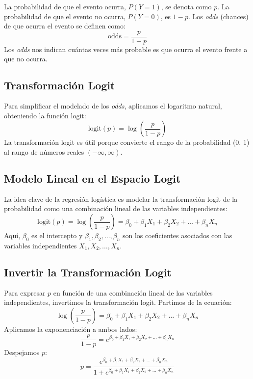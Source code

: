 La probabilidad de que el evento ocurra, $P(Y=1)$, se denota como $p$. La probabilidad de que el evento no ocurra, $P(Y=0)$, es $1-p$. Los \textit{odds} (chances) de que ocurra el evento se definen como:
\begin{equation}
\text{odds} = \frac{p}{1-p}
\end{equation}
Los \textit{odds} nos indican cuántas veces más probable es que ocurra el evento frente a que no ocurra.

\subsection*{Transformación Logit}

Para simplificar el modelado de los \textit{odds}, aplicamos el logaritmo natural, obteniendo la función logit:
\begin{equation}
\text{logit}(p) = \log\left(\frac{p}{1-p}\right)
\end{equation}
La transformación logit es útil porque convierte el rango de la probabilidad (0, 1) al rango de números reales $\left(-\infty, \infty\right)$.

\subsection*{Modelo Lineal en el Espacio Logit}

La idea clave de la regresión logística es modelar la transformación logit de la probabilidad como una combinación lineal de las variables independientes:
\begin{equation}
\text{logit}(p) = \log\left(\frac{p}{1-p}\right) = \beta_0 + \beta_1 X_1 + \beta_2 X_2 + \ldots + \beta_n X_n
\end{equation}
Aquí, $\beta_0$ es el intercepto y $\beta_1, \beta_2, \ldots, \beta_n$ son los coeficientes asociados con las variables independientes $X_1, X_2, \ldots, X_n$.

\subsection*{Invertir la Transformación Logit}

Para expresar $p$ en función de una combinación lineal de las variables independientes, invertimos la transformación logit. Partimos de la ecuación:
\begin{equation}
\log\left(\frac{p}{1-p}\right) = \beta_0 + \beta_1 X_1 + \beta_2 X_2 + \ldots + \beta_n X_n
\end{equation}
Aplicamos la exponenciación a ambos lados:
\begin{equation}
\frac{p}{1-p} = e^{\beta_0 + \beta_1 X_1 + \beta_2 X_2 + \ldots + \beta_n X_n}
\end{equation}
Despejamos $p$:
\begin{equation}
p = \frac{e^{\beta_0 + \beta_1 X_1 + \beta_2 X_2 + \ldots + \beta_n X_n}}{1 + e^{\beta_0 + \beta_1 X_1 + \beta_2 X_2 + \ldots + \beta_n X_n}}
\end{equation}

